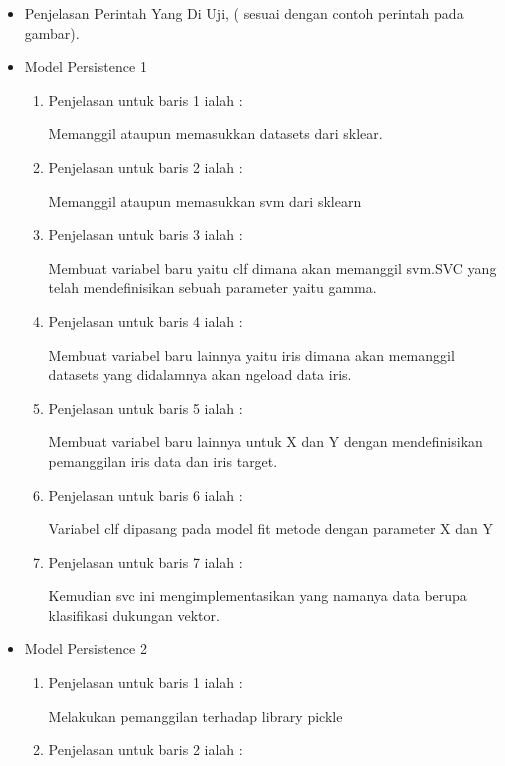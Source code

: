 \begin{enumerate}
\begin{itemize}
\par
\item Penjelasan Perintah Yang Di Uji, ( sesuai dengan contoh perintah pada gambar).
\item Model Persistence 1
\begin{enumerate}
\item Penjelasan untuk baris 1 ialah : 
\par Memanggil ataupun memasukkan datasets dari sklear.
\par
\par
\item Penjelasan untuk baris 2 ialah :
\par Memanggil ataupun memasukkan svm dari sklearn
\par
\item Penjelasan untuk baris 3 ialah :
\par Membuat variabel baru yaitu clf dimana akan memanggil svm.SVC yang telah mendefinisikan sebuah parameter yaitu gamma.
\par
\item Penjelasan untuk baris 4 ialah :
\par Membuat variabel baru lainnya yaitu iris dimana akan memanggil datasets yang didalamnya akan ngeload data iris.
\par
\item Penjelasan untuk baris 5 ialah :
\par Membuat variabel baru lainnya untuk X dan Y dengan mendefinisikan pemanggilan iris data dan iris target.
\par
\item Penjelasan untuk baris 6 ialah :
\par Variabel clf dipasang pada model fit metode dengan parameter X dan Y
\par
\item Penjelasan untuk baris 7 ialah : 
\par Kemudian svc ini mengimplementasikan yang namanya data berupa klasifikasi dukungan vektor.
\par
\par
\end{enumerate}
\item Model Persistence 2
\begin{enumerate}
\item Penjelasan untuk baris 1  ialah :
\par Melakukan pemanggilan terhadap library pickle
\par
\item Penjelasan untuk baris 2 ialah :

\end{enumerate}
\end{itemize}
\end{enumerate}
